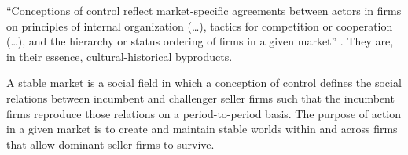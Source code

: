 \documentclass[a4paper, 12pt, openright, oneside, german, french, brazil, english]{abntex2}
\begin{document}
	
	``Conceptions of control reflect market-specific agreements between actors in firms on principles of internal organization (\dots), tactics for competition or cooperation (\dots), and the hierarchy or status ordering of firms in a given market'' \cite[p. 35]{fligstein2002architecture}. They are, in their essence, cultural-historical byproducts.

	
	\begin{citacao}
		A stable market is a social field in which a conception of control defines the social relations between incumbent and challenger seller firms such that the incumbent firms reproduce those relations on a period-to-period basis. The purpose of action in a given market is to create and maintain stable worlds within and across firms that allow dominant seller firms to survive. \cite[p. 35]{fligstein2002architecture}
	\end{citacao}
	
\end{document}
